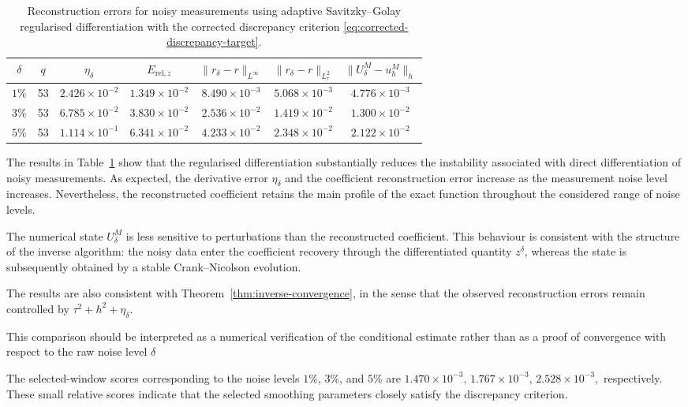 \documentclass[reqno]{amsart}
\begin{document}
\begin{table}[ht]
\centering
\caption{Reconstruction errors for noisy measurements using adaptive
Savitzky--Golay regularised differentiation with the corrected
discrepancy criterion \eqref{eq:corrected-discrepancy-target}.}
\label{tab:noisy-reconstruction}
\begin{tabular}{ccccccc}
\hline
\(\delta\)
&
\(q\)
&
\(\eta_\delta\)
&
\(E_{\mathrm{rel},z}\)
&
\(\|r_\delta-r\|_{L^\infty}\)
&
\(\|r_\delta-r\|_{L_\tau^2}\)
&
\(\|U_\delta^M-u_h^M\|_h\)
\\
\hline
$1\%$
& 53
& $2.426\times10^{-2}$
& $1.349\times10^{-2}$
& $8.490\times10^{-3}$
& $5.068\times10^{-3}$
& $4.776\times10^{-3}$
\\
$3\%$
& 53
& $6.785\times10^{-2}$
& $3.830\times10^{-2}$
& $2.536\times10^{-2}$
& $1.419\times10^{-2}$
& $1.300\times10^{-2}$
\\
$5\%$
& 53
& $1.114\times10^{-1}$
& $6.341\times10^{-2}$
& $4.233\times10^{-2}$
& $2.348\times10^{-2}$
& $2.122\times10^{-2}$
\\
\hline
\end{tabular}
\end{table}
The results in Table~\ref{tab:noisy-reconstruction} show that the
regularised differentiation substantially reduces the instability
associated with direct differentiation of noisy measurements.
As expected, the derivative error \(\eta_\delta\) and the coefficient
reconstruction error increase as the measurement noise level
increases. Nevertheless, the reconstructed coefficient retains the
main profile of the exact function throughout the considered range of
noise levels.

The numerical state \(U_\delta^M\) is less sensitive to perturbations
than the reconstructed coefficient. This behaviour is consistent with
the structure of the inverse algorithm: the noisy data enter the
coefficient recovery through the differentiated quantity
\(z^\delta\), whereas the state is subsequently obtained by a stable
Crank--Nicolson evolution.

The results are also consistent with
Theorem~\ref{thm:inverse-convergence}, in the sense that the observed
reconstruction errors remain controlled by $\tau^2+h^2+\eta_\delta.$

This comparison should be interpreted as a numerical verification of
the conditional estimate rather than as a proof of convergence with
respect to the raw noise level \(\delta\)

The selected-window scores corresponding to the noise levels $1\%$, $3\%$, and
$5\%$ are 
$1.470\times10^{-3},
\,
1.767\times10^{-3},
\,
2.528\times10^{-3},$
respectively. These small relative scores indicate that the selected smoothing parameters closely satisfy the discrepancy criterion.
\end{document}
